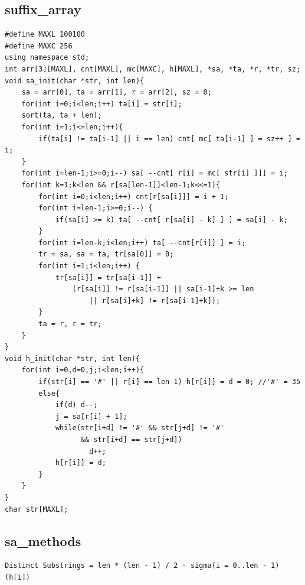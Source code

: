 \documentclass[a4paper]{article}
\begin{document}
\begin{CJK*}{UTF8}{gbsn}
\begin{multicols}{3}
\begin{flushleft}
\subsection{suffix\_array}
\begin{lstlisting}
#define MAXL 100100
#define MAXC 256
using namespace std;
int arr[3][MAXL], cnt[MAXL], mc[MAXC], h[MAXL], *sa, *ta, *r, *tr, sz;
void sa_init(char *str, int len){
    sa = arr[0], ta = arr[1], r = arr[2], sz = 0;
    for(int i=0;i<len;i++) ta[i] = str[i];
    sort(ta, ta + len);
    for(int i=1;i<=len;i++){
        if(ta[i] != ta[i-1] || i == len) cnt[ mc[ ta[i-1] ] = sz++ ] = i;
    }
    for(int i=len-1;i>=0;i--) sa[ --cnt[ r[i] = mc[ str[i] ]]] = i;
    for(int k=1;k<len && r[sa[len-1]]<len-1;k<<=1){
        for(int i=0;i<len;i++) cnt[r[sa[i]]] = i + 1;
        for(int i=len-1;i>=0;i--) {
            if(sa[i] >= k) ta[ --cnt[ r[sa[i] - k] ] ] = sa[i] - k;
        }
        for(int i=len-k;i<len;i++) ta[ --cnt[r[i]] ] = i;
        tr = sa, sa = ta, tr[sa[0]] = 0;
        for(int i=1;i<len;i++) {
            tr[sa[i]] = tr[sa[i-1]] +
                (r[sa[i]] != r[sa[i-1]] || sa[i-1]+k >= len
                    || r[sa[i]+k] != r[sa[i-1]+k]);
        }
        ta = r, r = tr;
    }
}
void h_init(char *str, int len){
    for(int i=0,d=0,j;i<len;i++){
        if(str[i] == '#' || r[i] == len-1) h[r[i]] = d = 0; //'#' = 35
        else{
            if(d) d--;
            j = sa[r[i] + 1];
            while(str[i+d] != '#' && str[j+d] != '#'
                  && str[i+d] == str[j+d])
                    d++;
            h[r[i]] = d;
        }
    }
}
char str[MAXL];
\end{lstlisting}

\subsection{sa\_methods}
\begin{lstlisting}
Distinct Substrings = len * (len - 1) / 2 - sigma(i = 0..len - 1)(h[i])
\end{lstlisting}

\end{flushleft}
\end{multicols}
\end{CJK*}
\end{document}
